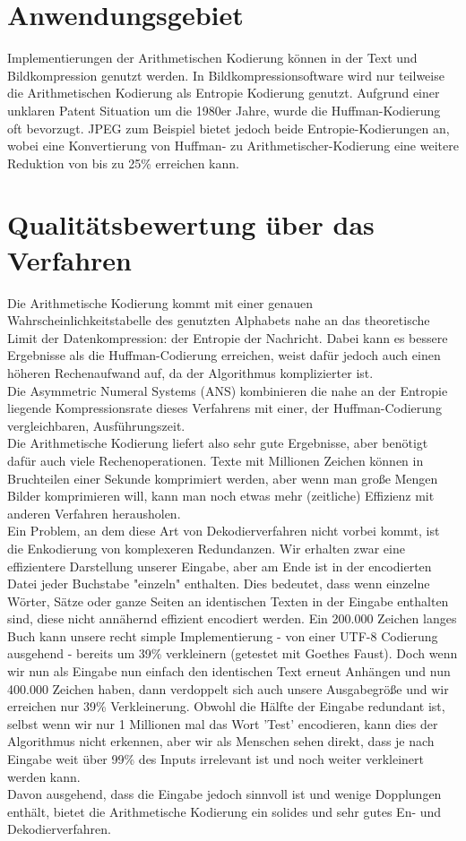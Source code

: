 \documentclass[a4paper]{article}
\theoremstyle{definition}
\theoremstyle{remark}
\begin{document}
		\section{Anwendungsgebiet}
	Implementierungen der Arithmetischen Kodierung können in der Text und Bildkompression genutzt werden. In Bildkompressionsoftware wird nur  teilweise die Arithmetischen Kodierung als Entropie Kodierung genutzt. Aufgrund einer unklaren Patent Situation um die 1980er Jahre, wurde die Huffman-Kodierung oft bevorzugt\cite{WIKI-EN}. JPEG zum Beispiel bietet jedoch beide Entropie-Kodierungen an, wobei eine Konvertierung von Huffman- zu Arithmetischer-Kodierung eine weitere Reduktion von bis zu 25\% erreichen kann.
	
			\section{Qualitätsbewertung über das Verfahren}
	Die Arithmetische Kodierung kommt mit einer genauen Wahrscheinlichkeitstabelle des genutzten Alphabets nahe an das theoretische Limit der Datenkompression: der Entropie der Nachricht. Dabei kann es bessere Ergebnisse als die Huffman-Codierung erreichen, weist dafür jedoch auch einen höheren Rechenaufwand auf, da der Algorithmus komplizierter ist.\\
	Die Asymmetric Numeral Systems (ANS)\cite{WIKI-ANS} kombinieren die nahe an der Entropie liegende Kompressionsrate dieses Verfahrens mit einer, der Huffman-Codierung vergleichbaren, Ausführungszeit.\\
	Die Arithmetische Kodierung liefert also sehr gute Ergebnisse, aber benötigt dafür auch viele Rechenoperationen. Texte mit Millionen Zeichen können in Bruchteilen einer Sekunde komprimiert werden, aber wenn man große Mengen Bilder komprimieren will, kann man noch etwas mehr (zeitliche) Effizienz mit anderen Verfahren herausholen.\\
	Ein Problem, an dem diese Art von Dekodierverfahren nicht vorbei kommt, ist die Enkodierung von komplexeren Redundanzen. Wir erhalten zwar eine effizientere Darstellung unserer Eingabe, aber am Ende ist in der encodierten Datei jeder Buchstabe "einzeln" enthalten. Dies bedeutet, dass wenn einzelne Wörter, Sätze oder ganze Seiten an identischen Texten in der Eingabe enthalten sind, diese nicht annähernd effizient encodiert werden. Ein 200.000 Zeichen langes Buch kann unsere recht simple Implementierung - von einer UTF-8 Codierung ausgehend - bereits um 39\% verkleinern (getestet mit Goethes Faust). Doch wenn wir nun als Eingabe nun einfach den identischen Text erneut Anhängen und nun 400.000 Zeichen haben, dann verdoppelt sich auch unsere Ausgabegröße und wir erreichen nur 39\% Verkleinerung. Obwohl die Hälfte der Eingabe redundant ist, selbst wenn wir nur 1 Millionen mal das Wort 'Test' encodieren, kann dies der Algorithmus nicht erkennen, aber wir als Menschen sehen direkt, dass je nach Eingabe weit über 99\% des Inputs irrelevant ist und noch weiter verkleinert werden kann.\\
	Davon ausgehend, dass die Eingabe jedoch sinnvoll ist und wenige Dopplungen enthält, bietet die Arithmetische Kodierung ein solides und sehr gutes En- und Dekodierverfahren.
	
\end{document}
